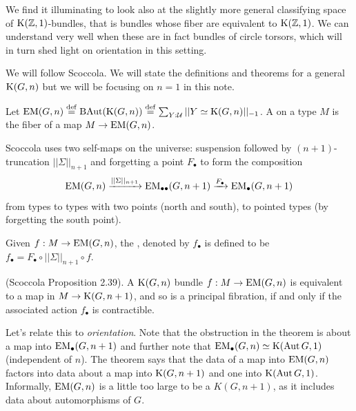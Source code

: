 We find it illuminating to look also at the slightly more general classifying space of \( \mathrm{K}(\mathbb{Z},1) \)-bundles, that is bundles whose fiber are equivalent to \( \mathrm{K}(\mathbb{Z},1) \). We can understand very well when these are in fact bundles of circle torsors, which will in turn shed light on orientation in this setting. 

We will follow Scoccola\cite{sco}. We will state the definitions and theorems for a general \( \mathrm{K}(G,n) \) but we will be focusing on \( n=1 \) in this note.

\begin{mydef}
Let \( \mathrm{EM}(G,n)\stackrel{\mathrm{def}}{=} \operatorname{BAut}(\mathrm{K}(G,n))\stackrel{\mathrm{def}}{=} \sum_{Y:\mathcal{U}}||Y\simeq \mathrm{K}(G,n)||_{-1}\). A  on a type \( M \) is the fiber of a map \( M\to\mathrm{EM}(G,n) \).
\end{mydef}

Scoccola uses two self-maps on the universe: suspension followed by \( (n+1) \)-truncation \( ||\Sigma||_{n+1} \) and forgetting a point \( F_\bullet \) to form the composition 
\[ 
\mathrm{EM}(G,n)\xrightarrow[]{||\Sigma||_{n+1}} \mathrm{EM}_{\bullet\bullet}(G,n+1)\xrightarrow[]{F_\bullet}\mathrm{EM_{\bullet}}(G,n+1)
\]
from types to types with two points (north and south), to pointed types (by forgetting the south point).

\begin{mydef}
Given \( f:M\to\mathrm{EM}(G,n) \), the , denoted by \( f_\bullet \) is defined to be \( f_\bullet=F_\bullet\circ||\Sigma||_{n+1}\circ f \).
\end{mydef}

\begin{mythm}
(Scoccola\cite{sco} Proposition 2.39). A \( \mathrm{K}(G,n) \) bundle \( f:M\to\mathrm{EM}(G,n) \) is equivalent to a map in \( M\to\mathrm{K}(G,n+1) \), and so is a principal fibration, if and only if the associated action \( f_\bullet \) is contractible.
\end{mythm}

Let's relate this to \emph{orientation}. Note that the obstruction in the theorem is about a map into \( \mathrm{EM_{\bullet}}(G,n+1) \) and further note that \( \mathrm{EM_{\bullet}}(G,n)\simeq \mathrm{K}(\operatorname{Aut} G,1) \) (independent of \( n \)). The theorem says that the data of a map into \( \mathrm{EM}(G,n) \) factors into data about a map into \( \mathrm{K}(G,n+1) \) and one into \( \mathrm{K}(\operatorname{Aut} G,1) \). Informally, \( \mathrm{EM}(G,n) \) is a little too large to be a \( K(G,n+1) \), as it includes data about automorphisms of \( G \).

